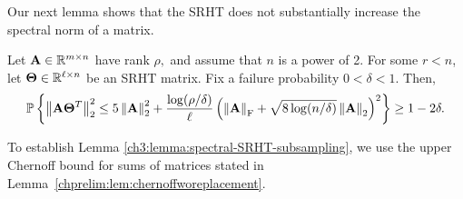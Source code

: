 % 

Our next lemma shows that the SRHT does not substantially increase the 
spectral norm of a matrix.

\begin{lemma}
\label{ch3:lemma:spectral-SRHT-subsampling}
Let $\mathbf{A} \in \mathbb{R}^{m \times n}$ have rank $\rho,$ and assume that $n$ is a power of 2. 
For some $r < n$, let $\mathbf{\Theta} \in \mathbb{R}^{\ell \times n}$ be an SRHT matrix. 
Fix a failure probability $0 < \delta < 1.$ Then,
\[
\mathbb{P}\left\{\left\|\mathbf{A} \mathbf{\Theta} ^T\right\|_2^2 \le 5 \left\|\mathbf{A}\right\|_2^2
+ \frac{\log (\rho/\delta)}{\ell} \left( \left\|\mathbf{A}\right\|_\mathrm{F} + \sqrt{8 \log(n/\delta)} 
\left\|\mathbf{A}\right\|_2 \right)^2 \right\}
\geq 1-2\delta.
\]
\end{lemma}
%
To establish Lemma \ref{ch3:lemma:spectral-SRHT-subsampling}, we use the 
upper Chernoff bound for sums of matrices stated in 
Lemma~\ref{chprelim:lem:chernoffworeplacement}.

